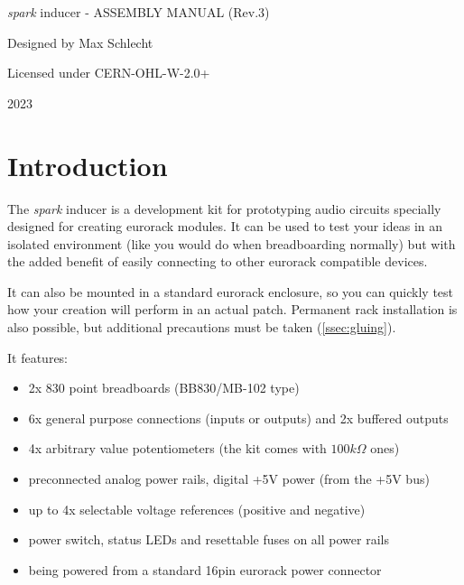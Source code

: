 \documentclass[12pt, a4paper]{article}
\begin{document}
\thispagestyle{empty}
\begin{center}
    \begin{minipage}{0.9\linewidth}
        \centering
        \vspace{4cm}
        {
            \Large
            \textit{spark} inducer \hspace{0.2em} - \hspace{0.2em} ASSEMBLY MANUAL
            \hspace{0.1em} \normalsize (Rev.3)
            \par
        }
        \vspace{1cm}
        \par
        \vspace{2cm}
        {\Large Designed by Max Schlecht\par}
        \vspace{0.5cm}
        {\large Licensed under \ibmplex CERN-OHL-W-2.0+ \par}
        \vspace{6cm}
        { \hfill \large 2023}
    \end{minipage}
\end{center}
\clearpage

\section*{Introduction}

The \textit{spark} inducer is a development kit for prototyping audio circuits specially
designed for creating eurorack modules. It can be used to test your ideas in an isolated
environment (like you would do when breadboarding normally) but with the added benefit of easily
connecting to other eurorack compatible devices.

It can also be mounted in a standard eurorack enclosure, so you can quickly test how your
creation will perform in an actual patch. Permanent rack installation is also possible, but
additional precautions must be taken (\autoref{ssec:gluing}).

\vspace{2mm}

It features:
\begin{itemize}[topsep=2pt]
    \item 2x 830 point breadboards (BB830/MB-102 type)
    \item 6x general purpose connections (inputs or outputs) and 2x buffered outputs
    \item 4x arbitrary value potentiometers (the kit comes with $100k\Omega$ ones)
    \item preconnected analog power rails, digital +5V power (from the +5V bus)
    \item up to 4x selectable voltage references (positive and negative)
    \item power switch, status LEDs and resettable fuses on all power rails 
    \item being powered from a standard 16pin eurorack power connector
\end{itemize}
\end{document}
